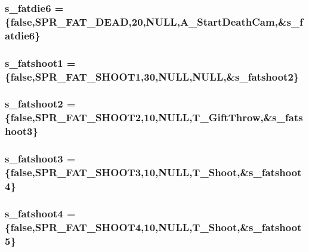 \label{WL__ACT2_8C_a2c89a533900581cc30bfb519c4ec5a96}
\hypertarget{WL__ACT2_8C_a91a685d3fe3d1f2b146adaf869a5b5a9}{
\subsubsection[{s\_\-fatdie6}]{ {\bf s\_\-fatdie6} = \{false,SPR\_\-FAT\_\-DEAD,20,NULL,A\_\-StartDeathCam,\&{\bf s\_\-fatdie6}\}}}
\label{WL__ACT2_8C_a91a685d3fe3d1f2b146adaf869a5b5a9}
\hypertarget{WL__ACT2_8C_ab2411da54246aa51474f6350d2543f64}{
\subsubsection[{s\_\-fatshoot1}]{ {\bf s\_\-fatshoot1} = \{false,SPR\_\-FAT\_\-SHOOT1,30,NULL,NULL,\&{\bf s\_\-fatshoot2}\}}}
\label{WL__ACT2_8C_ab2411da54246aa51474f6350d2543f64}
\hypertarget{WL__ACT2_8C_a06c31e5a19db898ace76aafe6988ea15}{
\subsubsection[{s\_\-fatshoot2}]{ {\bf s\_\-fatshoot2} = \{false,SPR\_\-FAT\_\-SHOOT2,10,NULL,T\_\-GiftThrow,\&{\bf s\_\-fatshoot3}\}}}
\label{WL__ACT2_8C_a06c31e5a19db898ace76aafe6988ea15}
\hypertarget{WL__ACT2_8C_a398b92fb8575c9200ec858c9ad239acd}{
\subsubsection[{s\_\-fatshoot3}]{ {\bf s\_\-fatshoot3} = \{false,SPR\_\-FAT\_\-SHOOT3,10,NULL,T\_\-Shoot,\&{\bf s\_\-fatshoot4}\}}}
\label{WL__ACT2_8C_a398b92fb8575c9200ec858c9ad239acd}
\hypertarget{WL__ACT2_8C_ab59a9c3c1f25eabf66d2a28f67736bda}{
\subsubsection[{s\_\-fatshoot4}]{ {\bf s\_\-fatshoot4} = \{false,SPR\_\-FAT\_\-SHOOT4,10,NULL,T\_\-Shoot,\&{\bf s\_\-fatshoot5}\}}}
